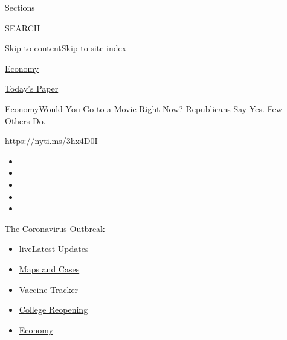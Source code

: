 Sections

SEARCH

\protect\hyperlink{site-content}{Skip to
content}\protect\hyperlink{site-index}{Skip to site index}

\href{https://www.nytimes3xbfgragh.onion/section/business/economy}{Economy}

\href{https://myaccount.nytimes3xbfgragh.onion/auth/login?response_type=cookie\&client_id=vi}{}

\href{https://www.nytimes3xbfgragh.onion/section/todayspaper}{Today's
Paper}

\href{/section/business/economy}{Economy}\textbar{}Would You Go to a
Movie Right Now? Republicans Say Yes. Few Others Do.

\url{https://nyti.ms/3hx4D0I}

\begin{itemize}
\item
\item
\item
\item
\item
\end{itemize}

\href{https://www.nytimes3xbfgragh.onion/news-event/coronavirus?action=click\&pgtype=Article\&state=default\&region=TOP_BANNER\&context=storylines_menu}{The
Coronavirus Outbreak}

\begin{itemize}
\tightlist
\item
  live\href{https://www.nytimes3xbfgragh.onion/2020/08/04/world/coronavirus-covid-19.html?action=click\&pgtype=Article\&state=default\&region=TOP_BANNER\&context=storylines_menu}{Latest
  Updates}
\item
  \href{https://www.nytimes3xbfgragh.onion/interactive/2020/us/coronavirus-us-cases.html?action=click\&pgtype=Article\&state=default\&region=TOP_BANNER\&context=storylines_menu}{Maps
  and Cases}
\item
  \href{https://www.nytimes3xbfgragh.onion/interactive/2020/science/coronavirus-vaccine-tracker.html?action=click\&pgtype=Article\&state=default\&region=TOP_BANNER\&context=storylines_menu}{Vaccine
  Tracker}
\item
  \href{https://www.nytimes3xbfgragh.onion/2020/08/02/us/covid-college-reopening.html?action=click\&pgtype=Article\&state=default\&region=TOP_BANNER\&context=storylines_menu}{College
  Reopening}
\item
  \href{https://www.nytimes3xbfgragh.onion/live/2020/08/03/business/stock-market-today-coronavirus?action=click\&pgtype=Article\&state=default\&region=TOP_BANNER\&context=storylines_menu}{Economy}
\end{itemize}

